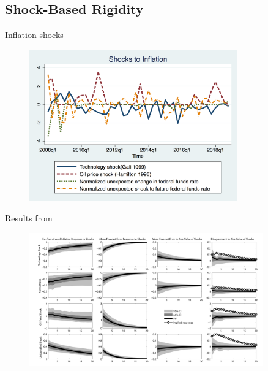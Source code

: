 \documentclass{beamer}
\begin{document}
\subsection{Shock-Based Rigidity}

\begin{frame}{Inflation shocks}

\begin{figure}
	\includegraphics[width=0.8\textwidth]{figuresDraft/inf_shocksQ.png} 
\end{figure}

\end{frame}

\begin{frame}{Results from \cite{coibion2012can}}

\begin{figure}
	\includegraphics[width=0.9\textwidth]{figuresDraft/RigidityJPEFigure2.png} 
\end{figure}

\end{frame}
\end{document}
